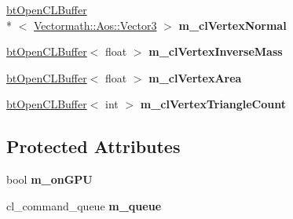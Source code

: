 \begin{DoxyCompactItemize}
\item 
\hypertarget{classbt_soft_body_vertex_data_open_c_l_a9f44acf89de068579c5171c79446cec9}{\hyperlink{classbt_open_c_l_buffer}{bt\+Open\+C\+L\+Buffer}\\*
$<$ \hyperlink{class_vectormath_1_1_aos_1_1_vector3}{Vectormath\+::\+Aos\+::\+Vector3} $>$ {\bfseries m\+\_\+cl\+Vertex\+Normal}}\label{classbt_soft_body_vertex_data_open_c_l_a9f44acf89de068579c5171c79446cec9}

\item 
\hypertarget{classbt_soft_body_vertex_data_open_c_l_a4cd5405b8095ffb88b3092897f07fb92}{\hyperlink{classbt_open_c_l_buffer}{bt\+Open\+C\+L\+Buffer}$<$ float $>$ {\bfseries m\+\_\+cl\+Vertex\+Inverse\+Mass}}\label{classbt_soft_body_vertex_data_open_c_l_a4cd5405b8095ffb88b3092897f07fb92}

\item 
\hypertarget{classbt_soft_body_vertex_data_open_c_l_a65b6ba4cd3e16f607fda8feeeeed4d1a}{\hyperlink{classbt_open_c_l_buffer}{bt\+Open\+C\+L\+Buffer}$<$ float $>$ {\bfseries m\+\_\+cl\+Vertex\+Area}}\label{classbt_soft_body_vertex_data_open_c_l_a65b6ba4cd3e16f607fda8feeeeed4d1a}

\item 
\hypertarget{classbt_soft_body_vertex_data_open_c_l_a5fa37bf0f36a2ed9619c63ade596abee}{\hyperlink{classbt_open_c_l_buffer}{bt\+Open\+C\+L\+Buffer}$<$ int $>$ {\bfseries m\+\_\+cl\+Vertex\+Triangle\+Count}}\label{classbt_soft_body_vertex_data_open_c_l_a5fa37bf0f36a2ed9619c63ade596abee}

\end{DoxyCompactItemize}
\subsection*{Protected Attributes}
\begin{DoxyCompactItemize}
\item 
\hypertarget{classbt_soft_body_vertex_data_open_c_l_a4cfb2e78e607358d0f9f56314c29e9b3}{bool {\bfseries m\+\_\+on\+G\+P\+U}}\label{classbt_soft_body_vertex_data_open_c_l_a4cfb2e78e607358d0f9f56314c29e9b3}

\item 
\hypertarget{classbt_soft_body_vertex_data_open_c_l_ac60f428be45d3371b98b9e9f4836eb36}{cl\+\_\+command\+\_\+queue {\bfseries m\+\_\+queue}}\label{classbt_soft_body_vertex_data_open_c_l_ac60f428be45d3371b98b9e9f4836eb36}

\end{DoxyCompactItemize}


